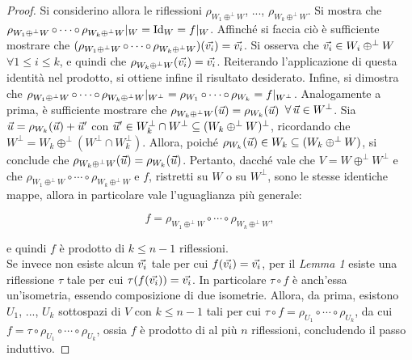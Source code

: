 \begin{proof}
	Si considerino allora le riflessioni $\rho_{W_1 \oplus^\perp W}$, ..., $\rho_{W_k \oplus^\perp W}$.
	Si mostra che $\restr{\rho_{W_1 \oplus^\perp W} \circ \cdots \circ \rho_{W_k \oplus^\perp W}}{W} = \Idw = \restr{f}{W}$.
	Affinché si faccia ciò è sufficiente mostrare che $(\rho_{W_1 \oplus^\perp W} \circ \cdots \circ \rho_{W_k \oplus^\perp W})(\vv i) = \vv i$. Si osserva che $\vv i \in W_i \oplus^\perp W$ $\forall 1 \leq i \leq k$, e
	quindi che $\rho_{W_k \oplus^\perp W}(\vv i) = \vv i$. Reiterando l'applicazione di questa identità nel prodotto,
	si ottiene infine il risultato desiderato. Infine, si dimostra che $\restr{\rho_{W_1 \oplus^\perp W} \circ \cdots \circ \rho_{W_k \oplus^\perp W}}{W^\perp} = \rho_{W_1} \circ \cdots \circ \rho_{W_k} = \restr{f}{W^\perp}$. Analogamente a prima,
	è sufficiente mostrare che $\rho_{W_k \oplus^\perp W}(\U) = \rho_{W_k}(\U)$ $\forall \U \in W^\perp$.
	Sia $\U = \rho_{W_k}(\U) + \U'$ con $\U' \in W_k^\perp \cap W^\perp \subseteq (W_k \oplus^\perp W)^\perp$,
	ricordando che $W^\perp = W_k \oplus^\perp (W^\perp \cap W_k^\perp)$.
	Allora, poiché $\rho_{W_k}(\U) \in W_k \subseteq (W_k \oplus^\perp W)$, si conclude che
	$\rho_{W_k \oplus^\perp W}(\U) = \rho_{W_k}(\U)$. Pertanto, dacché vale che $V = W \oplus^\perp W^\perp$ e che $\rho_{W_1 \oplus^\perp W} \circ \cdots \circ \rho_{W_k \oplus^\perp W}$ e $f$, ristretti su $W$ o su $W^\perp$, sono le stesse identiche mappe, allora
	in particolare vale l'uguaglianza più generale:
	
	\[ f = \rho_{W_1 \oplus^\perp W} \circ \cdots \circ \rho_{W_k \oplus^\perp W}, \]
	
	\vskip 0.05in
	
	e quindi $f$ è prodotto di $k \leq n-1$ riflessioni. \\
	
	Se invece non esiste alcun $\vv i$ tale per cui $f(\vv i) = \vv i$, per il \textit{Lemma 1} esiste
	una riflessione $\tau$ tale per cui $\tau(f(\vv i)) = \vv i$. In particolare $\tau \circ f$ è anch'essa
	un'isometria, essendo composizione di due isometrie. Allora, da prima, esistono $U_1$, ..., $U_k$ sottospazi
	di $V$ con $k \leq n-1$ tali per cui $\tau \circ f = \rho_{U_1} \circ \cdots \circ \rho_{U_k}$, da
	cui $f = \tau \circ \rho_{U_1} \circ \cdots \circ \rho_{U_k}$, ossia $f$ è prodotto di al più
	$n$ riflessioni, concludendo il passo induttivo.
\end{proof}

\setcounter{lemma}{0}

\hr

